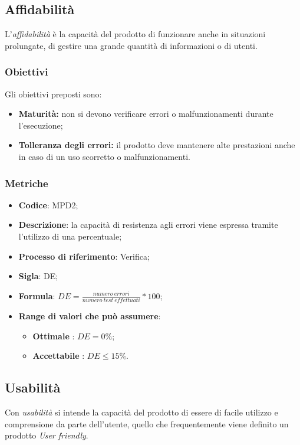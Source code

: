 \subsection{Affidabilità}
L'\textit{affidabilità} è la capacità del prodotto di funzionare anche in situazioni prolungate, di gestire una grande quantità di informazioni o di utenti.
\subsubsection{Obiettivi}
Gli obiettivi preposti sono:
\begin {itemize}
	\item \textbf{Maturità:} non si devono verificare errori o malfunzionamenti durante l'esecuzione;
	\item \textbf{Tolleranza degli errori:} il prodotto deve mantenere alte prestazioni anche in caso di un uso scorretto o malfunzionamenti.
\end{itemize}
\subsubsection{Metriche}
\vspace{-1cm}
\begin{itemize}
	\item \textbf{Codice}: MPD2;
	\item \textbf{Descrizione}: la capacità di resistenza agli errori viene espressa tramite l'utilizzo di una percentuale;
	\item \textbf{Processo di riferimento}: Verifica;
	\item \textbf{Sigla}: DE;
	\item \textbf{Formula}: \begin{math}DE=\frac{numero \ errori}{numero \ test \ effettuati}*100\end{math};
	\item \textbf{Range di valori che può assumere}: 
		\begin{itemize}
			\item \textbf{Ottimale} : $DE = 0 \%$;
			\item \textbf{Accettabile} : $DE \leq 15 \%$.
		\end{itemize}
\end{itemize}

\subsection{Usabilità}
Con \textit{usabilità} si intende la capacità del prodotto di essere di facile utilizzo e comprensione da parte dell'utente, quello che frequentemente viene definito un prodotto \textit{User friendly}.

